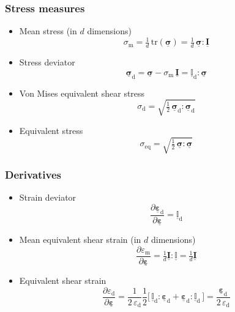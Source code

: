\documentclass[times,namecite]{goose-article}
\newcommand\T[1]{\underline{\bm{{#1}}}}
\newcommand\TT[1]{\underline{\mathbb{{#1}}}}
\begin{document}
\subsubsection{Stress measures}
\label{sec:nomenclature::stress}

\begin{itemize}
%
\item Mean stress (in $d$ dimensions)
%
\begin{equation}
\sigma_\mathrm{m}
= \tfrac{1}{d} \, \mathrm{tr} ( \T{\sigma} )
= \tfrac{1}{d} \, \T{\sigma} : \T{I}
\end{equation}
%
\item Stress deviator
%
\begin{equation}
  \T{\sigma}_\mathrm{d}
  = \T{\sigma} - \sigma_\mathrm{m} \, \T{I}
  = \TT{I}_\mathrm{d} : \T{\sigma}
\end{equation}
%
\item Von Mises equivalent shear stress
\begin{equation}
\sigma_\mathrm{d} = \sqrt{ \tfrac{1}{2} \, \T{\sigma}_\mathrm{d} : \T{\sigma}_\mathrm{d} }
\end{equation}
%
\item Equivalent stress
\begin{equation}
\sigma_\mathrm{eq} = \sqrt{ \tfrac{1}{2} \, \T{\sigma} : \T{\sigma} }
\end{equation}
%
\end{itemize}

\subsubsection{Derivatives}
\label{sec:nomenclature:derivatives}

\begin{itemize}
%
\item Strain deviator
\begin{equation}
  \frac{ \partial \T{\varepsilon}_\mathrm{d} }{ \partial \T{\varepsilon} }
  = \TT{I}_\mathrm{d}
\end{equation}
%
\item Mean equivalent shear strain (in $d$ dimensions)
\begin{equation}
  \frac{ \partial \varepsilon_\mathrm{m} }{ \partial \T{\varepsilon} }
  =
  \tfrac{1}{d} \T{I} : \TT{I}
  =
  \tfrac{1}{d} \T{I}
\end{equation}
%
\item Equivalent shear strain
\begin{equation}
  \frac{ \partial \varepsilon_\mathrm{d} }{ \partial \T{\varepsilon} }
  =
  \frac{1}{2 \, \varepsilon_\mathrm{d}} \frac{1}{2}
  \big[\, \TT{I}_\mathrm{d} : \T{\varepsilon}_\mathrm{d} + \T{\varepsilon}_\mathrm{d} : \TT{I}_\mathrm{d} \,\big]
  =
  \frac{\T{\varepsilon}_\mathrm{d}}{2 \, \varepsilon_\mathrm{d}}
\end{equation}
%
\end{itemize}
\end{document}
